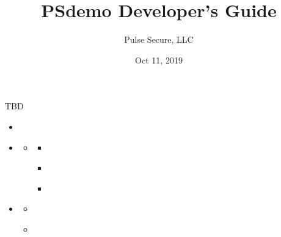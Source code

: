 \documentclass[letterpaper,10pt,english]{sphinxmanual}
\title{PSdemo Developer's Guide}
\date{Oct 11, 2019}
\author{Pulse Secure, LLC}
\begin{document}
\pagestyle{empty}
\sphinxmaketitle
\pagestyle{plain}
\sphinxtableofcontents
\pagestyle{normal}
\label{\detokenize{dev-guide::doc}}


TBD

\begin{sphinxShadowBox}
\begin{itemize}
\item {} 
\label{\detokenize{dev-guide:id1}}{\hyperref[\detokenize{dev-guide:introduction}]{}}

\item {} 
\label{\detokenize{dev-guide:id2}}{\hyperref[\detokenize{dev-guide:api-for-some-functionality}]{}}
\begin{itemize}
\item {} 
\label{\detokenize{dev-guide:id3}}{\hyperref[\detokenize{dev-guide:pet-store-apis}]{}}
\begin{itemize}
\item {} 
\label{\detokenize{dev-guide:id4}}{\hyperref[\detokenize{dev-guide:pet}]{}}

\item {} 
\label{\detokenize{dev-guide:id5}}{\hyperref[\detokenize{dev-guide:store}]{}}

\item {} 
\label{\detokenize{dev-guide:id6}}{\hyperref[\detokenize{dev-guide:user}]{}}

\end{itemize}

\end{itemize}

\item {} 
\label{\detokenize{dev-guide:id7}}{\hyperref[\detokenize{dev-guide:example-code}]{}}
\begin{itemize}
\item {} 
\label{\detokenize{dev-guide:id8}}{\hyperref[\detokenize{dev-guide:using-api-for-xyz-use-case}]{}}

\item {} 
\label{\detokenize{dev-guide:id9}}{\hyperref[\detokenize{dev-guide:using-api-for-mno-use-case}]{}}

\end{itemize}

\end{itemize}
\end{sphinxShadowBox}
\end{document}
